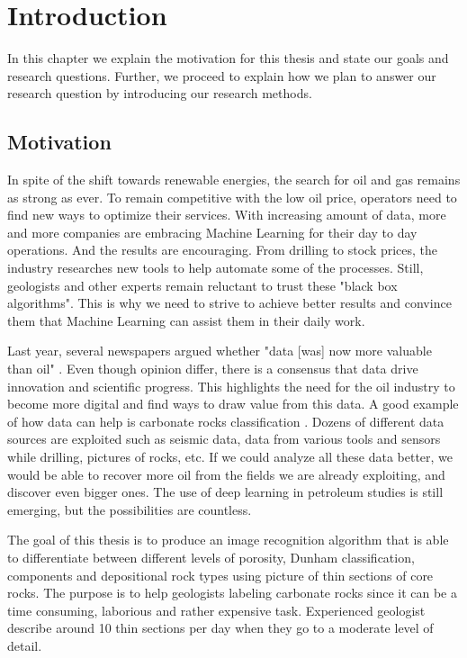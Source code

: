 \chapter{Introduction}
\label{chp:introduction} 
In this chapter we explain the motivation for this thesis and state our goals and research questions. Further, we  proceed to explain how we plan to answer our research question by introducing our research methods.   
\section{Motivation}
In spite of the shift towards renewable energies, the search for oil and gas remains as strong as ever. To remain competitive with the low oil price, operators need to find new ways to optimize their services. 
With increasing amount of data,  more and more companies are embracing Machine Learning for their day to day operations. And the results are encouraging. 
From drilling to stock prices, the industry researches new tools to help automate some of the processes. 
Still, geologists and other experts remain reluctant to trust these "black box algorithms". This is why we need to strive to achieve better results and convince them that Machine Learning can assist them in their daily work.

Last year, several newspapers argued whether "data [was] now more valuable than oil" \cite{economist,forbes}. Even though opinion differ, there is a consensus that data drive innovation and scientific progress. This highlights the need for the oil industry to become more digital and find ways to draw value from this data. A good example of how data can help is carbonate rocks classification \cite{carbo}. Dozens of different data sources are exploited such as seismic data, data from various tools and sensors while drilling, pictures of rocks, etc. If  we could analyze all these data better, we would be able to recover more oil from the fields we are already exploiting, and discover even bigger ones. The use of deep learning in petroleum studies is still emerging, but the possibilities are countless.


The goal of this thesis is to produce an image recognition algorithm that is able to differentiate between different levels of porosity,  Dunham classification, components and depositional rock types using picture of thin sections of core rocks. The purpose is to help geologists labeling carbonate rocks since it can be a time consuming, laborious and rather expensive task. Experienced geologist describe around 10 thin sections per day when they go to a moderate level of detail. 

